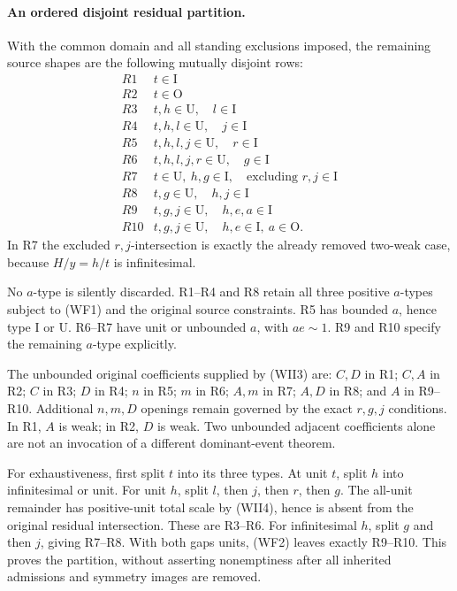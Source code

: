 \paragraph{An ordered disjoint residual partition.}
With the common domain and all standing exclusions imposed, the
remaining source shapes are the following mutually disjoint rows:
\[
\begin{array}{c|l}
 R1&t\in\mathrm I\\
 R2&t\in\mathrm O\\
 R3&t,h\in\mathrm U,\quad l\in\mathrm I\\
 R4&t,h,l\in\mathrm U,\quad j\in\mathrm I\\
 R5&t,h,l,j\in\mathrm U,\quad r\in\mathrm I\\
 R6&t,h,l,j,r\in\mathrm U,\quad g\in\mathrm I\\
 R7&t\in\mathrm U,\ h,g\in\mathrm I,\quad
                     \text{excluding }r,j\in\mathrm I\\
 R8&t,g\in\mathrm U,\quad h,j\in\mathrm I\\
 R9&t,g,j\in\mathrm U,\quad h,e,a\in\mathrm I\\
 R10&t,g,j\in\mathrm U,\quad h,e\in\mathrm I,\ a\in\mathrm O .
\end{array}                                                    \tag{WF3}
\]
In R7 the excluded $r,j$-intersection is exactly the already
removed two-weak case, because $H/y=h/t$ is infinitesimal.

No $a$-type is silently discarded. R1--R4 and R8 retain all three
positive $a$-types subject to (WF1) and the original source
constraints. R5 has bounded $a$, hence type $\mathrm I$ or
$\mathrm U$. R6--R7 have unit or unbounded $a$, with $ae\sim1$.
R9 and R10 specify the remaining $a$-type explicitly.

The unbounded original coefficients supplied by (WII3) are:
$C,D$ in R1; $C,A$ in R2; $C$ in R3; $D$ in R4;
$n$ in R5; $m$ in R6; $A,m$ in R7; $A,D$ in R8;
and $A$ in R9--R10. Additional $n,m,D$ openings remain governed
by the exact $r,g,j$ conditions. In R1, $A$ is weak; in R2, $D$
is weak. Two unbounded adjacent coefficients alone are not an
invocation of a different dominant-event theorem.

For exhaustiveness, first split $t$ into its three types. At unit
$t$, split $h$ into infinitesimal or unit. For unit $h$, split $l$,
then $j$, then $r$, then $g$. The all-unit remainder has
positive-unit total scale by (WII4), hence is absent from the
original residual intersection. These are R3--R6.
For infinitesimal $h$, split $g$ and then $j$, giving R7--R8.
With both gaps units, (WF2) leaves exactly R9--R10. This proves
the partition, without asserting nonemptiness after all inherited
admissions and symmetry images are removed.

